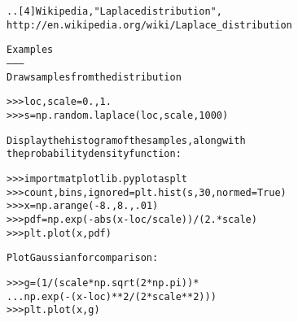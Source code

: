 \begin{boxedminipage}{\funcwidth}
\begin{alltt}
.. [4] Wikipedia, "Laplace distribution",
       http://en.wikipedia.org/wiki/Laplace\_distribution

Examples
--------
Draw samples from the distribution

{\textgreater}{\textgreater}{\textgreater} loc, scale = 0., 1.
{\textgreater}{\textgreater}{\textgreater} s = np.random.laplace(loc, scale, 1000)

Display the histogram of the samples, along with
the probability density function:

{\textgreater}{\textgreater}{\textgreater} import matplotlib.pyplot as plt
{\textgreater}{\textgreater}{\textgreater} count, bins, ignored = plt.hist(s, 30, normed=True)
{\textgreater}{\textgreater}{\textgreater} x = np.arange(-8., 8., .01)
{\textgreater}{\textgreater}{\textgreater} pdf = np.exp(-abs(x-loc/scale))/(2.*scale)
{\textgreater}{\textgreater}{\textgreater} plt.plot(x, pdf)

Plot Gaussian for comparison:

{\textgreater}{\textgreater}{\textgreater} g = (1/(scale * np.sqrt(2 * np.pi)) * 
...      np.exp( - (x - loc)**2 / (2 * scale**2) ))
{\textgreater}{\textgreater}{\textgreater} plt.plot(x,g)
\end{alltt}

\setlength{\parskip}{1ex}
    \end{boxedminipage}

    \label{trunk:qstkutil:bollinger:logistic}

    \vspace{0.5ex}

